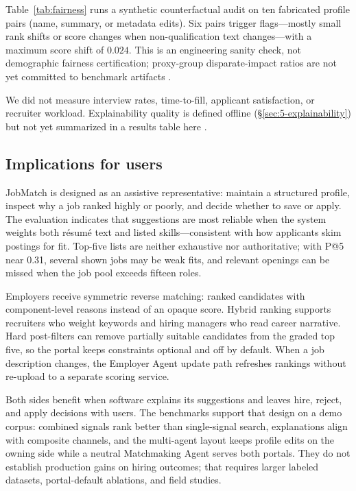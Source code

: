 Table~\ref{tab:fairness} runs a synthetic counterfactual audit on ten fabricated profile pairs (name, summary, or metadata edits).
Six pairs trigger flags---mostly small rank shifts or score changes when non-qualification text changes---with a maximum score shift of $0.024$.
This is an engineering sanity check, not demographic fairness certification; proxy-group disparate-impact ratios are not yet committed to benchmark artifacts .

\begin{JTable}

\end{JTable}

We did not measure interview rates, time-to-fill, applicant satisfaction, or recruiter workload.
Explainability quality is defined offline (\S\ref{sec:5-explainability}) but not yet summarized in a results table here .

\subsection{Implications for users}\label{sec:6-implications}

JobMatch is designed as an assistive representative: maintain a structured profile, inspect why a job ranked highly or poorly, and decide whether to save or apply.
The evaluation indicates that suggestions are most reliable when the system weights both résumé text and listed skills---consistent with how applicants skim postings for fit.
Top-five lists are neither exhaustive nor authoritative; with P@5 near 0.31, several shown jobs may be weak fits, and relevant openings can be missed when the job pool exceeds fifteen roles.

Employers receive symmetric reverse matching: ranked candidates with component-level reasons instead of an opaque score.
Hybrid ranking supports recruiters who weight keywords and hiring managers who read career narrative.
Hard post-filters can remove partially suitable candidates from the graded top five, so the portal keeps constraints optional and off by default.
When a job description changes, the Employer Agent update path refreshes rankings without re-upload to a separate scoring service.

Both sides benefit when software explains its suggestions and leaves hire, reject, and apply decisions with users.
The benchmarks support that design on a demo corpus: combined signals rank better than single-signal search, explanations align with composite channels, and the multi-agent layout keeps profile edits on the owning side while a neutral Matchmaking Agent serves both portals.
They do not establish production gains on hiring outcomes; that requires larger labeled datasets, portal-default ablations, and field studies.
